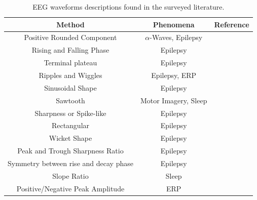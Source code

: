 \documentclass[brainsci,article,submit,moreauthors,pdftex,10pt,a4paper]{mdpi}
\begin{document}



\begin{table}[H]
\caption{EEG waveforms descriptions found in the surveyed literature.}
\centering
\begin{tabular}{ccc}
\toprule
\textbf{Method}	& \textbf{Phenomena} & \textbf{Reference}	\\
\midrule
Positive Rounded Component                    & $\alpha$-Waves, Epilepsy & \citep{Schomer2010,Tatum2008} \\
Rising and Falling Phase      & Epilepsy &  \citep{Thakor2004,Tatum2008} \\
Terminal plateau      & Epilepsy &  \citep{Thakor2004} \\
Ripples and Wiggles     & Epilepsy, ERP &  \citep{EEGIntro, Thakor2004,Cacioppo2007,Kappenman2012} \\
Sinusoidal Shape        & Epilepsy &  \citep{Cacioppo2007,Tatum2008,Ouyang2017,Kappenman2012,Cole2017} \\
Sawtooth                     & Motor Imagery, Sleep &  \citep{EEGIntro,Rodenbeck2006,Tatum2008} \\
Sharpness or Spike-like     & Epilepsy &  \citep{Thakor2004,Hartman2005,Sanei2007,EEGIntro} \\
Rectangular     & Epilepsy &  \citep{Thakor2004,Cole2017} \\
Wicket Shape     & Epilepsy &  \citep{EEGIntro,Hartman2005,Sanei2007,Tatum2008,Schomer2010,Cole2017} \\
Peak and Trough Sharpness Ratio     & Epilepsy &  \citep{Hartman2005,Sanei2007,Lawrence2010,Cole2017} \\
Symmetry between rise and decay phase     & Epilepsy &  \citep{Hartman2005,Cole2017} \\
Slope Ratio    & Sleep &  \citep{Subha2010} \\
Positive/Negative Peak Amplitude & ERP & \citep{Thakor2004,Hartman2005,Tatum2008,Mak2012,MullerPutz2015,Cole2017} \\

\end{tabular}
\end{table}
\end{document}
